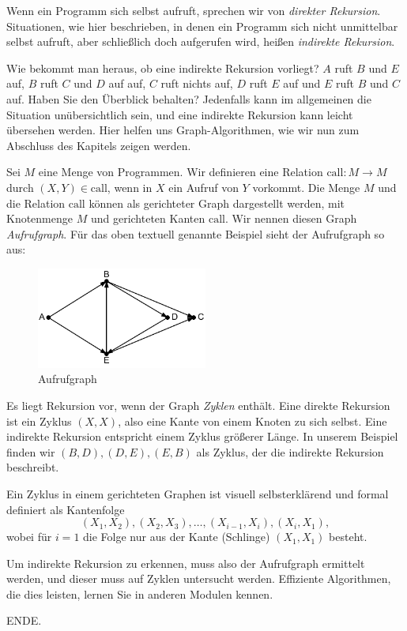 Wenn ein Programm sich selbst aufruft, sprechen wir von \emph{direkter Rekursion}. 
Situationen, wie hier beschrieben, in denen ein Programm sich nicht unmittelbar selbst aufruft, aber schließlich doch aufgerufen wird, heißen \emph{indirekte Rekursion}.

Wie bekommt man heraus, ob eine indirekte Rekursion vorliegt? $A$ ruft $B$ und $E$ auf, $B$ ruft $C$ und $D$ auf auf, $C$ ruft nichts auf, $D$ ruft $E$ auf und $E$ ruft $B$ und $C$ auf. Haben Sie den Überblick behalten? Jedenfalls kann im allgemeinen die Situation unübersichtlich sein, und eine indirekte Rekursion kann leicht übersehen werden. Hier helfen uns Graph-Algorithmen, wie wir nun zum Abschluss des Kapitels zeigen werden.

Sei $M$ eine Menge von Programmen. Wir definieren eine Relation $ \text{call} \colon M \to M$ durch $(X, Y) \in \text{call}$, wenn in $X$ ein Aufruf von $Y$ vorkommt. Die Menge $M$ und die Relation $\text{call}$ können als gerichteter Graph dargestellt werden, mit Knotenmenge $M$ und gerichteten Kanten $\text{call}$. Wir nennen diesen Graph \emph{Aufrufgraph}. 
Für das oben textuell genannte Beispiel sieht der Aufrufgraph so aus:

\begin{figure}[h]
	\centering
	\includegraphics[width=0.50\textwidth]{Bilder/Kapitel-11/Aufrufgraph.pdf}
	\caption{Aufrufgraph}
	\label{fig:aufrufgraph}
\end{figure}

Es liegt Rekursion vor, wenn der Graph \textit{Zyklen} enthält. Eine direkte Rekursion ist ein Zyklus $(X,X)$, also eine Kante von einem Knoten zu sich selbst. Eine indirekte Rekursion entspricht einem Zyklus größerer Länge. In unserem Beispiel finden wir $(B,D), (D, E), (E,B)$ als Zyklus, der die indirekte Rekursion beschreibt.

Ein Zyklus in einem gerichteten Graphen ist visuell selbsterklärend und formal \mbox{definiert} als Kantenfolge 
$$ (X_1, X_2), (X_2, X_3), \ldots , (X_{i-1}, X_{i}), (X_{i}, X_1),$$ 
wobei für $i=1$ die Folge nur aus der Kante (Schlinge) $(X_1, X_1)$ besteht.

Um indirekte Rekursion zu erkennen, muss also der Aufrufgraph ermittelt werden, und dieser muss auf Zyklen untersucht werden. Effiziente Algorithmen, die dies leisten, lernen Sie in anderen Modulen kennen.

\vspace{1.5cm}
ENDE.